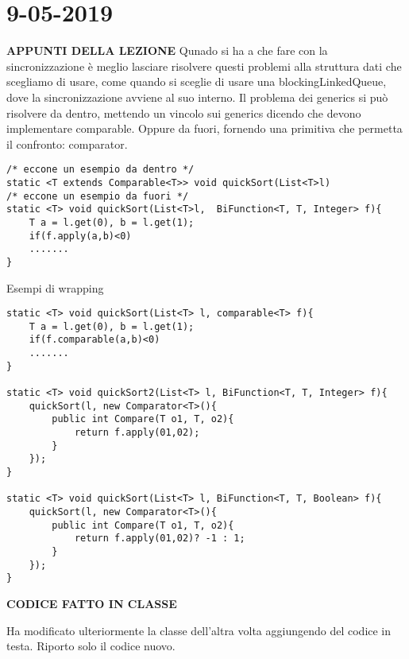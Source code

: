 

\newpage
\section{9-05-2019}
\noindent \textbf{APPUNTI DELLA LEZIONE} \newline
Qunado si ha a che fare con la sincronizzazione è meglio lasciare risolvere questi problemi alla struttura dati che scegliamo di usare, come quando si sceglie di usare una blockingLinkedQueue, dove la sincronizzazione avviene al suo interno. \newline
Il problema dei generics si può risolvere da dentro, mettendo un vincolo sui generics dicendo che devono implementare comparable. Oppure da fuori, fornendo una primitiva che permetta il confronto: comparator. \newline
\begin{lstlisting}
/* eccone un esempio da dentro */
static <T extends Comparable<T>> void quickSort(List<T>l)
/* eccone un esempio da fuori */
static <T> void quickSort(List<T>l,  BiFunction<T, T, Integer> f){
	T a = l.get(0), b = l.get(1);
	if(f.apply(a,b)<0)
	.......
}
\end{lstlisting}

\noindent Esempi di wrapping
\begin{lstlisting}
static <T> void quickSort(List<T> l, comparable<T> f){
	T a = l.get(0), b = l.get(1);
	if(f.comparable(a,b)<0)
	.......
}

static <T> void quickSort2(List<T> l, BiFunction<T, T, Integer> f){
	quickSort(l, new Comparator<T>(){
		public int Compare(T o1, T, o2){
			return f.apply(01,02);
		}
	});
}

static <T> void quickSort(List<T> l, BiFunction<T, T, Boolean> f){
	quickSort(l, new Comparator<T>(){
		public int Compare(T o1, T, o2){
			return f.apply(01,02)? -1 : 1;
		}
	});
}

\end{lstlisting}
\noindent \textbf{CODICE FATTO IN CLASSE} \newline

\noindent Ha modificato ulteriormente la classe dell'altra volta aggiungendo del codice in testa. Riporto solo il codice nuovo.
 
